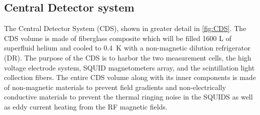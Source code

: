 \subsection{Central Detector system}

The Central Detector System (CDS), shown in greater detail in \cref{fig:CDS}. The CDS volume is made of fiberglass composite which will be filled 1600 L of superfluid helium and cooled to 0.4~K with a non-magnetic dilution refrigerator (DR). The purpose of the CDS is to harbor the two measurement cells, the high voltage electrode system, SQUID magnetometers array, and the  scintillation light collection fibers. The entire CDS volume along with its inner components is made of non-magnetic materials to prevent field gradients and non-electrically conductive materials to prevent the thermal ringing noise in the SQUIDS as well as eddy current heating from the RF magnetic fields. 


